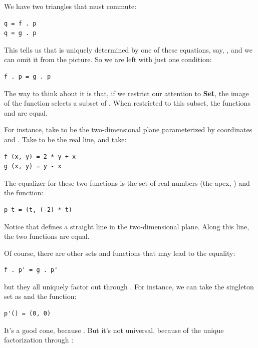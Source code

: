 \noindent
We have two triangles that must commute:

\begin{Verbatim}[commandchars=\\\{\}]
q = f . p 
q = g . p
\end{Verbatim}
This tells us that  is uniquely determined by one of these
equations, say, , and we can omit it from the
picture. So we are left with just one condition:

\begin{Verbatim}[commandchars=\\\{\}]
f . p = g . p
\end{Verbatim}
The way to think about it is that, if we restrict our attention to
\textbf{Set}, the image of the function  selects a subset of
. When restricted to this subset, the functions  and
 are equal.

For instance, take  to be the two-dimensional plane
parameterized by coordinates  and . Take 
to be the real line, and take:

\begin{Verbatim}[commandchars=\\\{\}]
f (x, y) = 2 * y + x 
g (x, y) = y - x
\end{Verbatim}
The equalizer for these two functions is the set of real numbers (the
apex, ) and the function:

\begin{Verbatim}[commandchars=\\\{\}]
p t = (t, (-2) * t)
\end{Verbatim}
Notice that  defines a straight line in the
two-dimensional plane. Along this line, the two functions are equal.

Of course, there are other sets  and functions
 that may lead to the equality:

\begin{Verbatim}[commandchars=\\\{\}]
f . p' = g . p'
\end{Verbatim}
but they all uniquely factor out through . For instance, we
can take the singleton set \code{()} as  and the
function:

\begin{Verbatim}[commandchars=\\\{\}]
p'() = (0, 0)
\end{Verbatim}
It's a good cone, because . But it's
not universal, because of the unique factorization through :


